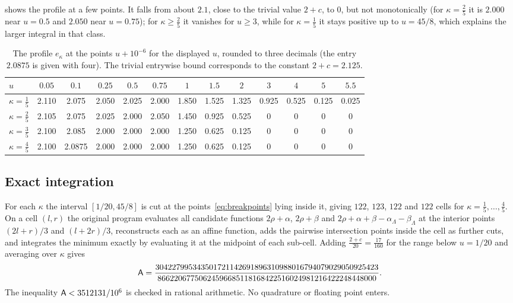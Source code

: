  shows the profile at a few points. It falls from about $2.1$, close to
the trivial value $2+c$, to $0$, but not monotonically (for $\kappa=\frac25$ it is $2.000$ near
$u=0.5$ and $2.050$ near $u=0.75$); for $\kappa\ge\frac25$ it vanishes for $u\ge3$, while for
$\kappa=\frac15$ it stays positive up to $u=45/8$, which explains the larger integral in that
class.

\begin{table}[ht]
\centering
\small
\setlength{\tabcolsep}{4.6pt}
\begin{tabular}{@{}lcccccccccccc@{}}
\toprule
$u$ & $0.05$ & $0.1$ & $0.25$ & $0.5$ & $0.75$ & $1$ & $1.5$ & $2$ & $3$ & $4$ & $5$ & $5.5$\\
\midrule
$\kappa=\frac15$ & 2.110 & 2.075 & 2.050 & 2.025 & 2.000 & 1.850 & 1.525 & 1.325 & 0.925 & 0.525 & 0.125 & 0.025\\
$\kappa=\frac25$ & 2.105 & 2.075 & 2.025 & 2.000 & 2.050 & 1.450 & 0.925 & 0.525 & 0 & 0 & 0 & 0\\
$\kappa=\frac35$ & 2.100 & 2.085 & 2.000 & 2.000 & 2.000 & 1.250 & 0.625 & 0.125 & 0 & 0 & 0 & 0\\
$\kappa=\frac45$ & 2.100 & 2.0875 & 2.000 & 2.000 & 2.000 & 1.250 & 0.625 & 0.125 & 0 & 0 & 0 & 0\\
\bottomrule
\end{tabular}
\caption{The profile $e_\kappa$ at the points $u+10^{-6}$ for the displayed $u$, rounded to three
decimals (the entry $2.0875$ is given with four). The trivial
entrywise bound corresponds to the constant $2+c=2.125$.}
\label{tab:profile}
\end{table}

\subsection{Exact integration}\label{subsec:exact-integration}

For each $\kappa$ the interval $[1/20,45/8]$ is cut at the points~\eqref{eq:breakpoints} lying
inside it, giving $122$, $123$, $122$ and $122$ cells for $\kappa=\frac15,\dots,\frac45$. On a cell
$(l,r)$ the original program evaluates all candidate functions
$2\rho+\alpha$, $2\rho+\beta$ and $2\rho+\alpha+\beta-\alpha_\Lambda-\beta_\Lambda$ at the interior
points $(2l+r)/3$ and $(l+2r)/3$, reconstructs each as an affine function, adds the pairwise
intersection points inside the cell as further cuts, and integrates the minimum exactly by
evaluating it at the midpoint of each sub-cell. Adding $\frac{2+c}{20}=\frac{17}{160}$ for the
range below $u=1/20$ and averaging over $\kappa$ gives
\[
  \mathsf{A}=\frac{304227995343501721142691896310988016794079029050925423}
           {86622067750624596685118168422516024981216422248448000}.
\]
The inequality $\mathsf{A}<3512131/10^6$ is checked in rational arithmetic. No quadrature or floating
point enters.

